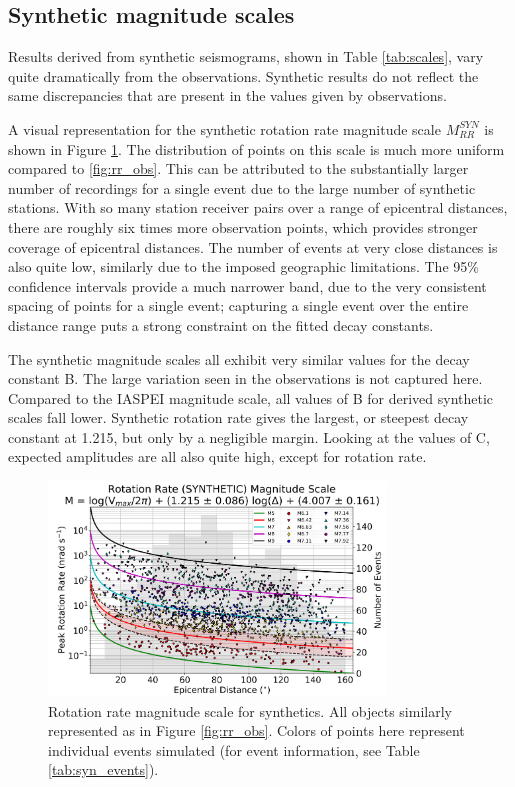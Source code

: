\documentclass{gji}
\begin{document}
\subsection{Synthetic magnitude scales}
Results derived from synthetic seismograms, shown in Table \ref{tab:scales}, vary quite dramatically from the observations. Synthetic results do not reflect the same discrepancies that are present in the values given by observations.

A visual representation for the synthetic rotation rate magnitude scale $M_{RR}^{SYN}$ is shown in Figure \ref{fig:syn_scale}. The distribution of points on this scale is much more uniform compared to \ref{fig:rr_obs}. This can be attributed to the substantially larger number of recordings for a single event due to the large number of synthetic stations. With so many station receiver pairs over a range of epicentral distances, there are roughly six times more observation points, which provides stronger coverage of epicentral distances. The number of events at very close distances is also quite low, similarly due to the imposed geographic limitations. The 95\% confidence intervals provide a much narrower band, due to the very consistent spacing of points for a single event; capturing a single event over the entire distance range puts a strong constraint on the fitted decay constants.

The synthetic magnitude scales all exhibit very similar values for the decay constant B. The large variation seen in the observations is not captured here. Compared to the IASPEI magnitude scale, all values of B for derived synthetic scales fall lower. Synthetic rotation rate gives the largest, or steepest decay constant at 1.215, but only by a negligible margin. Looking at the values of C, expected amplitudes are all also quite high, except for rotation rate.

\begin{figure}
\centerline{\includegraphics[width=0.8\textwidth]{RR_SYN}}
\caption{Rotation rate magnitude scale for synthetics. All objects similarly represented as in Figure \ref{fig:rr_obs}. Colors of points here represent individual events simulated (for event information, see Table \ref{tab:syn_events}).}
\label{fig:syn_scale}
\end{figure}
\end{document}
